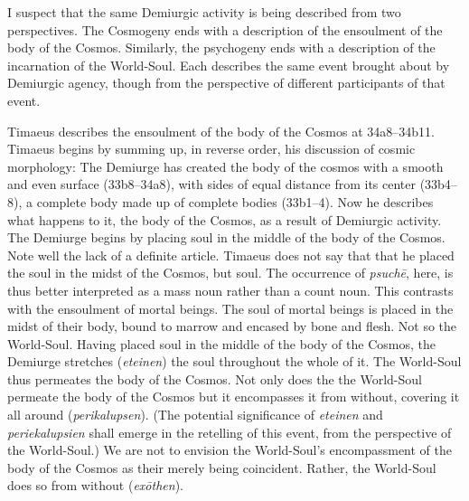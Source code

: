 I suspect that the same Demiurgic activity is being described from two perspectives. The Cosmogeny ends with a description of the ensoulment of the body of the Cosmos. Similarly, the psychogeny ends with a description of the incarnation of the World-Soul. Each describes the same event brought about by Demiurgic agency, though from the perspective of different participants of that event.

Timaeus describes the ensoulment of the body of the Cosmos at 34a8--34b11. Timaeus begins by summing up, in reverse order, his discussion of cosmic morphology: The Demiurge has created the body of the cosmos with a smooth and even surface (33b8--34a8), with sides of equal distance from its center (33b4--8), a complete body made up of complete bodies (33b1--4). Now he describes what happens to it, the body of the Cosmos, as a result of Demiurgic activity. The Demiurge begins by placing soul in the middle of the body of the Cosmos. Note well the lack of a definite article. Timaeus does not say that that he placed the soul in the midst of the Cosmos, but soul. The occurrence of \emph{psuchē}, here, is thus better interpreted as a mass noun rather than a count noun. This contrasts with the ensoulment of mortal beings. The soul of mortal beings is placed in the midst of their body, bound to marrow and encased by bone and flesh. Not so the World-Soul. Having placed soul in the middle of the body of the Cosmos, the Demiurge stretches (\emph{eteinen}) the soul throughout the whole of it. The World-Soul thus permeates the body of the Cosmos. Not only does the the World-Soul permeate the body of the Cosmos but it encompasses it from without, covering it all around (\emph{perikalupsen}). (The potential significance of \emph{eteinen} and \emph{periekalupsien} shall emerge in the retelling of this event, from the perspective of the World-Soul.) We are not to envision the World-Soul's encompassment of the body of the Cosmos as their merely being coincident. Rather, the World-Soul does so from without (\emph{exōthen}).

